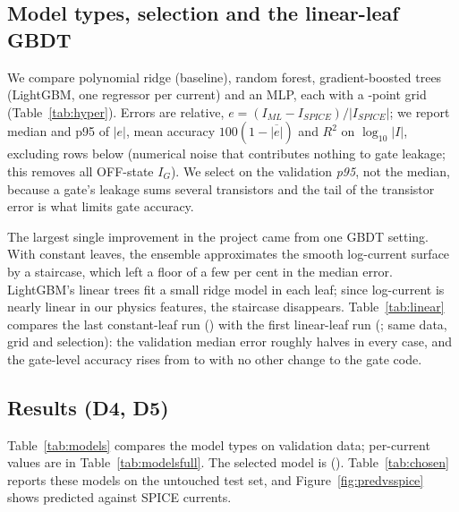 \subsection{Model types, selection and the linear-leaf GBDT}
We compare polynomial ridge (baseline), random forest, gradient-boosted trees (LightGBM, one
regressor per current) and an MLP, each with a \GridPoints-point grid (Table~\ref{tab:hyper}).
Errors are relative, $e=(I_{ML}-I_{SPICE})/|I_{SPICE}|$; we report median and p95 of $|e|$, mean
accuracy $100(1-\overline{|e|})$ and $R^2$ on $\log_{10}|I|$, excluding rows below \IFloor{}
(numerical noise that contributes nothing to gate leakage; this removes all OFF-state $I_G$). We
select on the validation \emph{p95}, not the median, because a gate's leakage sums several
transistors and the tail of the transistor error is what limits gate accuracy.

\begin{table}[H]
  \centering
  \small
  \caption{Model types, fixed settings and validation grids.}
  \label{tab:hyper}
  \fittable{}
\end{table}

The largest single improvement in the project came from one GBDT setting. With constant leaves,
the ensemble approximates the smooth log-current surface by a staircase, which left a floor of a
few per cent in the median error. LightGBM's linear trees fit a small ridge model in each leaf;
since log-current is nearly linear in our physics features, the staircase disappears.
Table~\ref{tab:linear} compares the last constant-leaf run (\ConstLeafCommit) with the first
linear-leaf run (\LinLeafCommit; same data, grid and selection): the validation median error
roughly halves in every case, and the gate-level accuracy rises from \ConstLeafGateMeanAcc{} to
\LinLeafGateMeanAcc{} with no other change to the gate code.

\begin{table}[H]
  \centering
  \small
  \caption{Constant vs.\ linear leaves: validation errors of the chosen GBDT (mean over currents)
  and gate-level mean accuracy.}
  \label{tab:linear}
  \fittable{}
\end{table}

\subsection{Results (D4, D5)}
Table~\ref{tab:models} compares the model types on validation data; per-current values are in
Table~\ref{tab:modelsfull}. The selected model is \ChosenSummary{} (\ChosenHyperNmosOff{}).
Table~\ref{tab:chosen} reports these models on the untouched test set, and
Figure~\ref{fig:predvsspice} shows predicted against SPICE currents.

